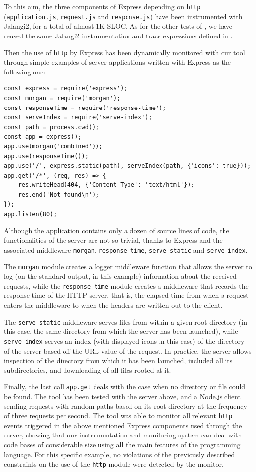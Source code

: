 To this aim, the three components of Express depending on \lstinline{http} (\lstinline{application.js}, \lstinline{request.js} and
\lstinline{response.js}) have been instrumented with Jalangi2, for a total of almost 1K SLOC.
As for the other tests of , we have reused the same Jalangi2 instrumentation and trace expressions defined in .

Then the use of \lstinline{http} by Express has been dynamically monitored with our tool through simple
examples of server applications written with Express as the following one:
\begin{lstlisting}
const express = require('express');
const morgan = require('morgan');
const responseTime = require('response-time');
const serveIndex = require('serve-index');
const path = process.cwd();
const app = express();
app.use(morgan('combined'));
app.use(responseTime());
app.use('/', express.static(path), serveIndex(path, {'icons': true}));
app.get('/*', (req, res) => {
    res.writeHead(404, {'Content-Type': 'text/html'});
    res.end('Not found\n');
});
app.listen(80);
\end{lstlisting}
Although the application contains only a dozen of source lines of code, the
functionalities of the server are not so trivial, thanks to Express and the
associated middleware \lstinline{morgan}, \lstinline{response-time}, \lstinline{serve-static} and
\lstinline{serve-index}.

The \lstinline{morgan} module creates a logger middleware function that allows the server to log (on the standard output, in this example)
information about the received requests, while the \lstinline{response-time} module
creates a middleware that records the response time of the HTTP server, that is, the elapsed time from when a
request enters the middleware to when the headers are written out to the client.

The  \lstinline{serve-static} middleware serves files from within a given root directory (in this case, the same directory
from which the server has been launched), while \lstinline{serve-index} serves an index (with displayed icons in this case)
of the directory of the server based off the URL value of the request. In practice, the server allows inspection of the directory
from which it has been launched, included all its subdirectories, and downloading of all files rooted at it.

Finally, the last call \lstinline{app.get} deals with the case when no directory or file could be found.
The tool has been tested with the server above, and a Node.js client sending requests with random  paths based on its root directory at the frequency of three requests per second.
The tool was able to monitor all relevant \lstinline{http} events triggered in the above mentioned Express components used through the server, showing that our instrumentation and monitoring system can deal with code bases of considerable size using all the main features of the programming language.
For this specific example, no violations of the previously described constraints on the use of the \lstinline{http} module were detected by the monitor.


